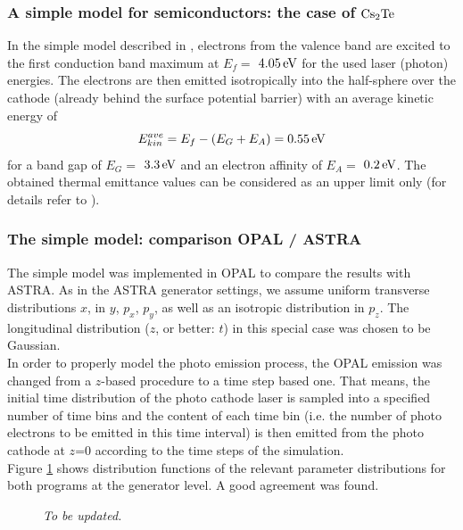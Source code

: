 \documentclass{psi-note}    %
\newcommand{\unit}[2]{$#1\, \rm{#2}$}
\begin{document}
{\subsubsection{A simple model for semiconductors: the case of $\rm{Cs_2Te}$}
In the simple model described in \cite{KLAUS}, electrons from the valence band
are excited to the first conduction band maximum at $E_f =$ \unit{4.05}{eV} for
the used laser (photon) energies. The electrons are then emitted isotropically
into the half-sphere over the cathode (already behind the surface potential
barrier) with an average kinetic energy of $$E_{kin}^{ave} = E_f - (E_G + E_A) =
0.55 \, \rm{eV}$$ for a band gap of $E_G =$ \unit{3.3}{eV} and an electron
affinity of $E_A =$ \unit{0.2}{eV}. The obtained thermal emittance values can be
considered as an upper limit only (for details refer to \cite{KLAUS}).

\subsubsection{The simple model: comparison OPAL / ASTRA}
The simple model was implemented in OPAL to compare the results with ASTRA. As
in the ASTRA generator settings, we assume uniform transverse distributions $x$,
in $y$, $p_x$, $p_y$, as well as an isotropic distribution in $p_z$. The
longitudinal distribution ($z$, or better: $t$) in this special case was chosen
to be Gaussian. \\
In order to properly model the photo emission process, the OPAL emission was
changed from a $z$-based procedure to a time step based one. That means, the
initial time distribution of the photo cathode laser is sampled into a specified
number of time bins and the content of each time bin (i.e. the number of photo
electrons to be emitted in this time interval) is then emitted from the photo
cathode at $z$=0 according to the time steps of the simulation.\\
Figure \ref{PLOT1} shows distribution functions of the relevant parameter
distributions for both programs at the generator level. A good agreement was
found.

\begin{figure}[ht!]
    \begin{center}
    \end{center}
    \caption{\small \sl To be updated.} 
    \label{PLOT1}
\end{figure}

}
\end{document}
